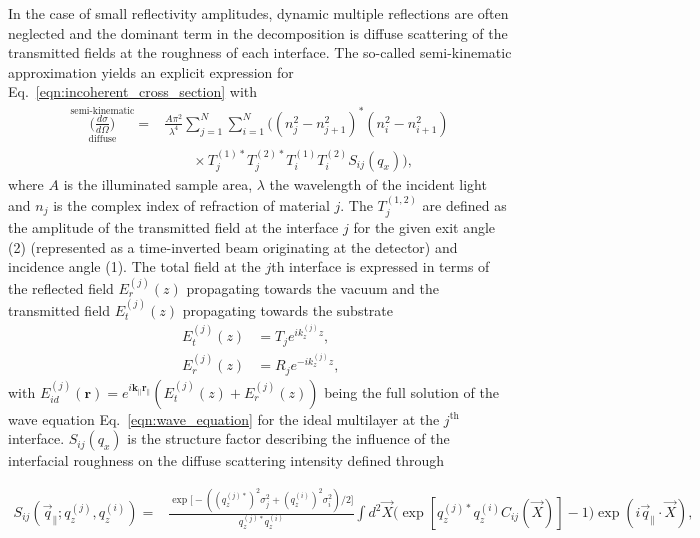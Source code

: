 \documentclass[twocolumn,osajnl,showpacs,superscriptaddress,11pt]{revtex4-1}
\begin{document}
In the case of small reflectivity amplitudes, dynamic multiple reflections are often neglected and the dominant term in the decomposition is diffuse scattering of the transmitted fields at the roughness of each interface. The so-called semi-kinematic approximation \cite{PhysRevB.38.2297} yields an explicit expression for Eq.~\eqref{eqn:incoherent_cross_section} with
\begin{align}
                \overset{\text{semi-kinematic}}{\underset{\text{diffuse}}{\Big(\frac{d \sigma}{d \Omega}\Big)}} = &\frac{A \pi^2}{\lambda^4}\sum \limits_{j=1}^{N}\sum \limits_{i=1}^{N} \Big((n_j^2 - n_{j+1}^2)^* (n_i^2 - n_{i+1}^2) \nonumber \\ &\qquad\times T^{(1)*}_j T^{(2)*}_j T^{(1)}_i T^{(2)}_i S_{i j}(q_x)\Big)\text{,} \label{eqn:semi_kinematic_theory} 
\end{align}
where $A$ is the illuminated sample area, $\lambda$ the wavelength of the incident light and $n_j$ is the complex index of refraction of material $j$. The $T^{(1,2)}_j$ are defined as the amplitude of the transmitted field at the interface $j$ for the given exit angle (2) (represented as a time-inverted beam originating at the detector) and incidence angle (1). The total field at the $j$th interface is expressed in terms of the reflected field $E_r^{(j)}(z)$ propagating towards the vacuum and the transmitted field $E_t^{(j)}(z)$ propagating towards the substrate
\begin{align}
	E_t^{(j)}(z) &= T_{j} e^{i k_z^{(j)} z} \text{,} \\
	E_r^{(j)}(z) &= R_{j} e^{-i k_z^{(j)} z} \text{,} 
\end{align}
with $E_{id}^{(j)}(\mathbf{r}) = e^{i \mathbf{k_\parallel r_\parallel}} (E_t^{(j)}(z) + E_r^{(j)}(z))$ being the full solution of the wave equation Eq.~\eqref{eqn:wave_equation} for the ideal multilayer at the $j^\text{th}$ interface. $S_{ij}(q_x)$ is the structure factor describing the influence of the interfacial roughness on the diffuse scattering intensity defined through
\begin{widetext}
\begin{align}
S_{ij}(\vec{q}_\parallel; q_z^{(j)}, q_z^{(i)}) = &\frac{\exp \Big[-((q_z^{(j)*})^{2} \sigma_j^2 + (q_z^{(i)})^{2} \sigma_i^2)/2\Big]}{q_z^{(j)*} q_z^{(i)}} \int d^2 \vec{X} \Big(\exp [q_z^{(j)*} q_z^{(i)} C_{ij}(\vec{X})]-1\Big) \exp(i \vec{q}_\parallel \cdot \vec{X}) \text{,} \label{eqn:full_structure_factor}
\end{align}
\end{widetext}
\end{document}
